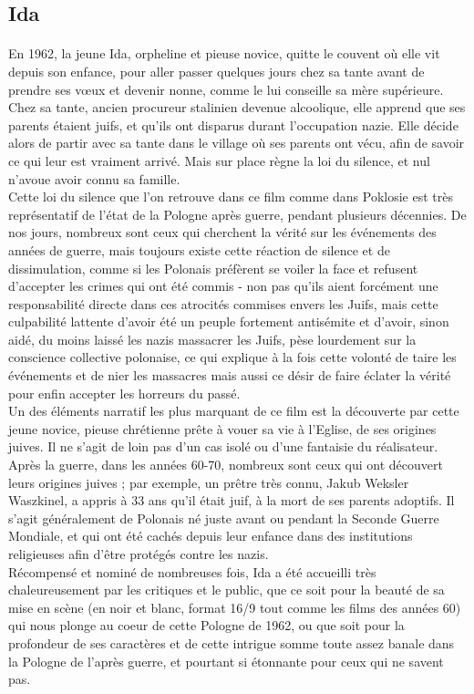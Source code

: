 \documentclass[12pt]{amsart}
\begin{document}
\subsection*{Ida}
\paragraph{}
En 1962, la jeune Ida, orpheline et pieuse novice, quitte le couvent où elle vit depuis son enfance, pour aller passer quelques jours chez sa tante avant de prendre ses vœux et devenir nonne, comme le lui conseille sa mère supérieure. Chez sa tante, ancien procureur stalinien devenue alcoolique, elle apprend que ses parents étaient juifs, et qu'ils ont disparus durant l’occupation nazie. Elle décide alors de partir avec sa tante dans le village où ses parents ont vécu, afin de savoir ce qui leur est vraiment arrivé. Mais sur place règne la loi du silence, et nul n’avoue avoir connu sa famille. \\
Cette loi du silence que l'on retrouve dans ce film comme dans Poklosie est très représentatif de l'état de la Pologne après guerre, pendant plusieurs décennies. De nos jours, nombreux sont ceux qui cherchent la vérité sur les événements des années de guerre, mais toujours existe cette réaction de silence et de dissimulation, comme si les Polonais préfèrent se voiler la face et refusent d'accepter les crimes qui ont été commis - non pas qu'ils aient forcément une responsabilité directe dans ces atrocités commises envers les Juifs, mais cette culpabilité lattente d'avoir été un peuple fortement antisémite et d'avoir, sinon aidé, du moins laissé les nazis massacrer les Juifs, pèse lourdement sur la conscience collective polonaise, ce qui explique à la fois cette volonté de taire les événements et de nier les massacres mais aussi ce désir de faire éclater la vérité pour enfin accepter les horreurs du passé.\\
Un des éléments narratif les plus marquant de ce film est la découverte par cette jeune novice, pieuse chrétienne prête à vouer sa vie à l'Eglise, de ses origines juives. Il ne s'agit de loin pas d'un cas isolé ou d'une fantaisie du réalisateur. Après la guerre, dans les années 60-70, nombreux sont ceux qui ont découvert leurs origines juives ; par exemple, un prêtre très connu, Jakub Weksler Waszkinel, a appris à 33 ans qu'il était juif, à la mort de ses parents adoptifs. Il s'agit généralement de Polonais né juste avant ou pendant la Seconde Guerre Mondiale, et qui ont été cachés depuis leur enfance dans des institutions religieuses afin d'être protégés contre les nazis. \\

Récompensé et nominé de nombreuses fois, Ida a été accueilli très chaleureusement par les critiques et le public, que ce soit pour la beauté de sa mise en scène (en noir et blanc, format 16/9 tout comme les films des années 60) qui nous plonge au coeur de cette Pologne de 1962, ou que soit pour la profondeur de ses caractères et de cette intrigue somme toute assez banale dans la Pologne de l'après guerre, et pourtant si étonnante pour ceux qui ne savent pas. 
\clearpage


\end{document}
